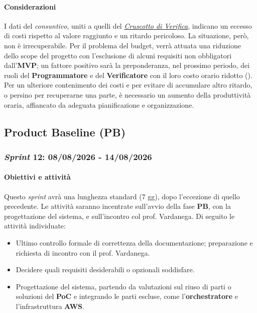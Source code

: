 \documentclass[12pt, a4paper]{article}
\begin{document}
{\paragraph{Considerazioni} I dati del \textit{consuntivo}, uniti a quelli del \href{https://skynetunigroup.github.io/Code_Guardian/Documentazione/RTB/piano_di_qualifica_v1.0.0.pdf}{\textit{Cruscotto di Verifica}}, indicano un eccesso di costi rispetto al valore raggiunto e un ritardo pericoloso. La situazione, però, non è irrecuperabile. Per il problema del budget, verrà attuata una riduzione dello scope del progetto con l'esclusione di alcuni requisiti non obbligatori dall'\textbf{MVP}; un fattore positivo sarà la preponderanza, nel prossimo periodo, dei ruoli del \textbf{Programmatore} e del \textbf{Verificatore} con il loro costo orario ridotto (). Per un ulteriore contenimento dei costi e per evitare di accumulare altro ritardo, o persino per recuperarne una parte, è necessario un aumento della produttività oraria, affiancato da adeguata pianificazione e organizzazione.

\subsection{Product Baseline (\textbf{PB})}

\subsubsection{\textit{Sprint} 12: 08/08/2026 - 14/08/2026}

\paragraph{Obiettivi e attività}

Questo \textit{sprint} avrà una lunghezza standard (7 gg), dopo l'eccezione di quello precedente. Le attività saranno incentrate sull'avvio della fase \textbf{PB}, con la progettazione del sistema, e sull'incontro col prof. Vardanega. Di seguito le attività individuate:

\begin{itemize}
    \item Ultimo controllo formale di correttezza della documentazione; preparazione e richiesta di incontro con il prof. Vardanega.
    \item Decidere quali requisiti desiderabili o opzionali soddisfare.
    \item Progettazione del sistema, partendo da valutazioni sul riuso di parti o soluzioni del \textbf{PoC} e integrando le parti escluse, come l'\textbf{orchestratore} e l'infrastruttura \textbf{AWS}.
\end{itemize}

}
\end{document}
